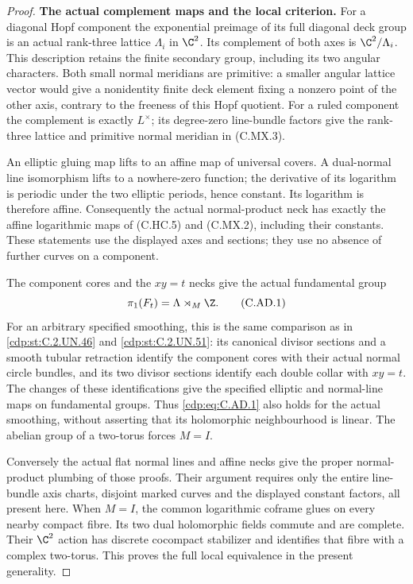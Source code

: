 \begin{proof}
\par\medskip\noindent\textbf{The actual complement maps and the local criterion.}
For a diagonal Hopf component the exponential preimage of its full
diagonal deck group is an actual rank-three lattice $\Lambda_i$ in
$\C^2$. Its complement of both axes is $\C^2/\Lambda_i$. This
description retains the finite secondary group, including its two
angular characters. Both small normal meridians are primitive: a
smaller angular lattice vector would give a nonidentity finite deck
element fixing a nonzero point of the other axis, contrary to the
freeness of this Hopf quotient. For a ruled component the complement
is exactly $L^\times$; its degree-zero line-bundle factors give the
rank-three lattice and primitive normal meridian in (C.MX.3).

An elliptic gluing map lifts to an affine map of universal covers.
A dual-normal line isomorphism lifts to a nowhere-zero function;
the derivative of its logarithm is periodic under the two elliptic
periods, hence constant. Its logarithm is therefore affine.
Consequently the actual normal-product neck has exactly the affine
logarithmic maps of (C.HC.5) and (C.MX.2), including their constants.
These statements use the displayed axes and sections; they use no
absence of further curves on a component.

The component cores and the $xy=t$ necks give the actual fundamental
group
\[
                         \pi_1(F_t)=\Lambda\rtimes_M\Z.
                                                        \tag{C.AD.1}\label{cdp:eq:C.AD.1}
\]
For an arbitrary specified smoothing, this is the same comparison
as in \ref{cdp:st:C.2.UN.46} and \ref{cdp:st:C.2.UN.51}: its canonical divisor sections and a smooth
tubular retraction identify the component cores with their actual
normal circle bundles, and its two divisor sections identify each
double collar with $xy=t$. The changes of these identifications
give the specified elliptic and normal-line maps on fundamental
groups. Thus \eqref{cdp:eq:C.AD.1} also holds for the actual smoothing, without
asserting that its holomorphic neighbourhood is linear. The
abelian group of a two-torus forces $M=I$.

Conversely the actual flat normal lines and affine necks give the
proper normal-product plumbing of those proofs. Their argument
requires only the entire line-bundle axis charts, disjoint marked
curves and the displayed constant factors, all present here.
When $M=I$, the common logarithmic coframe glues on every nearby
compact fibre. Its two dual holomorphic fields commute and are
complete. Their $\C^2$ action has discrete cocompact stabilizer
and identifies that fibre with a complex two-torus. This proves
the full local equivalence in the present generality.


\end{proof}
